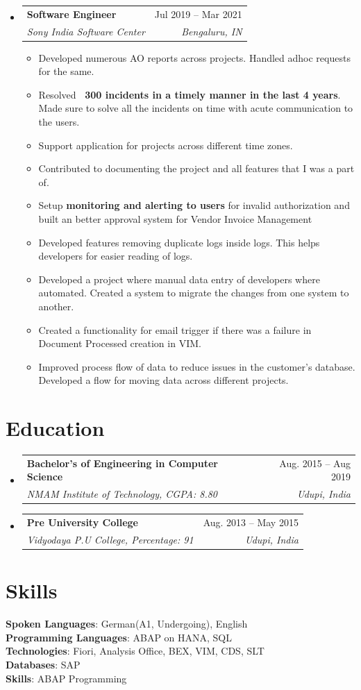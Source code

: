\documentclass[letterpaper,11pt]{article}
\makeatletter
\newcommand{\resumeItem}[1]{
  \item\small{
    {#1 \vspace{-2pt}}
  }
}
\newcommand{\resumeSubheading}[4]{
  \vspace{-2pt}\item
    \begin{tabular*}{0.97\textwidth}[t]{l@{\extracolsep{\fill}}r}
      \textbf{#1} & #2 \\
      \textit{\small#3} & \textit{\small #4} \\
    \end{tabular*}\vspace{-7pt}
}
\newcommand{\resumeSubHeadingListStart}{\begin{itemize}[leftmargin=0.15in, label={}]}
\newcommand{\resumeSubHeadingListEnd}{\end{itemize}}
\newcommand{\resumeItemListStart}{\begin{itemize}}
\newcommand{\resumeItemListEnd}{\end{itemize}\vspace{-5pt}}
\makeatother
\begin{document}
    \resumeSubHeadingListStart
        \resumeSubheading
        {Software Engineer}{Jul 2019 -- Mar 2021}
        {Sony India Software Center}{Bengaluru, IN}
         \resumeItemListStart
    
        \resumeItem{Developed numerous AO reports across projects. Handled adhoc requests for the same.}
        \resumeItem{Resolved \textbf{~300 incidents in a timely manner in the last 4 years}. Made sure to solve all the incidents on time with acute communication to the users.}
        \resumeItem{Support application for projects across different time zones.}
        \resumeItem{Contributed to documenting the project and all features that I was a part of.}
        \resumeItem{Setup \textbf{monitoring and alerting to users} for invalid authorization and built an better approval system for Vendor Invoice Management}
        \resumeItem{Developed features removing  duplicate logs inside logs. This helps developers for easier reading of logs.}
        \resumeItem{Developed a project where manual data entry of developers where automated. Created a system to migrate the changes from one system to another.}
        \resumeItem{Created a functionality for email trigger if there was a failure in Document Processed creation in VIM.}
        \resumeItem{Improved process flow of data to reduce issues in the customer's database. Developed a flow for moving data across different projects.}
        \resumeItemListEnd
    \resumeSubHeadingListEnd
     
  


\section{Education}
  \resumeSubHeadingListStart
    \resumeSubheading
      {Bachelor's of Engineering in Computer Science}{Aug. 2015 -- Aug 2019}
      {NMAM Institute of Technology, CGPA: 8.80}{Udupi, India}
    \resumeSubheading
      {Pre University College}{Aug. 2013 -- May 2015}
      {Vidyodaya P.U College, Percentage: 91}{Udupi, India}
  \resumeSubHeadingListEnd


%
\section{Skills}
 \begin{itemize}[leftmargin=0.15in, label={}]
    \small{\item{
     \textbf{Spoken Languages}{: German(A1, Undergoing), English} \\
     \textbf{Programming Languages}{: ABAP on HANA, SQL} \\
     \textbf{Technologies}{: Fiori, Analysis Office, BEX, VIM, CDS, SLT} \\
     \textbf{Databases}{: SAP} \\
     \textbf{Skills}{: ABAP Programming}
    }}
 \end{itemize}


\end{document}
